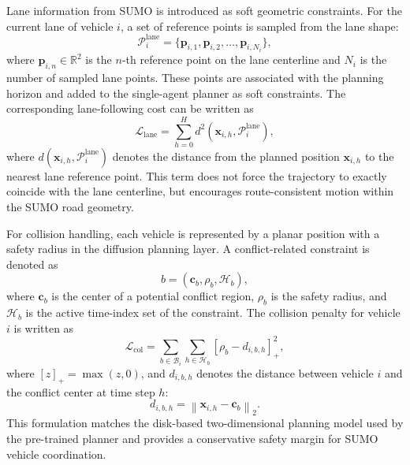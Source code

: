 \documentclass[journal]{IEEEtran}
\begin{document}
Lane information from SUMO is introduced as soft geometric constraints. For the current lane of vehicle $i$, a set of reference points is sampled from the lane shape:
\begin{equation}
\mathcal{P}_{i}^{\mathrm{lane}}
=
\{\mathbf{p}_{i,1},\mathbf{p}_{i,2},\ldots,\mathbf{p}_{i,N_i}\},
\label{eq_lane_points}
\end{equation}
where $\mathbf{p}_{i,n}\in\mathbb{R}^{2}$ is the $n$-th reference point on the lane centerline and $N_i$ is the number of sampled lane points. These points are associated with the planning horizon and added to the single-agent planner as soft constraints. The corresponding lane-following cost can be written as
\begin{equation}
\mathcal{L}_{\mathrm{lane}}
=
\sum_{h=0}^{H}
d^{2}
\left(
\mathbf{x}_{i,h},
\mathcal{P}_{i}^{\mathrm{lane}}
\right),
\label{eq_lane_cost}
\end{equation}
where $d(\mathbf{x}_{i,h},\mathcal{P}_{i}^{\mathrm{lane}})$ denotes the distance from the planned position $\mathbf{x}_{i,h}$ to the nearest lane reference point. This term does not force the trajectory to exactly coincide with the lane centerline, but encourages route-consistent motion within the SUMO road geometry.

For collision handling, each vehicle is represented by a planar position with a safety radius in the diffusion planning layer. A conflict-related constraint is denoted as
\begin{equation}
b
=
\left(
\mathbf{c}_{b},
\rho_b,
\mathcal{H}_{b}
\right),
\label{eq_constraint_element}
\end{equation}
where $\mathbf{c}_{b}$ is the center of a potential conflict region, $\rho_b$ is the safety radius, and $\mathcal{H}_{b}$ is the active time-index set of the constraint. The collision penalty for vehicle $i$ is written as
\begin{equation}
\mathcal{L}_{\mathrm{col}}
=
\sum_{b\in\mathcal{B}_i}
\sum_{h\in\mathcal{H}_{b}}
\left[
\rho_b
-
d_{i,b,h}
\right]_{+}^{2},
\label{eq_collision_loss}
\end{equation}
where $[z]_{+}=\max(z,0)$, and $d_{i,b,h}$ denotes the distance between vehicle $i$ and the conflict center at time step $h$:
\begin{equation}
d_{i,b,h}
=
\left\|
\mathbf{x}_{i,h}
-
\mathbf{c}_{b}
\right\|_{2}.
\label{eq_conflict_distance}
\end{equation}
This formulation matches the disk-based two-dimensional planning model used by the pre-trained planner and provides a conservative safety margin for SUMO vehicle coordination.
\end{document}
